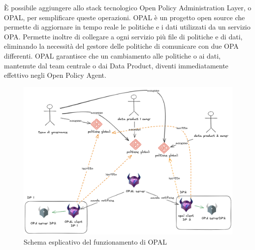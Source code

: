 \documentclass[12pt]{report}
\begin{document}
È possibile aggiungere allo stack tecnologico Open Policy Administration Layer, o OPAL, per semplificare queste operazioni.
OPAL è un progetto open source che permette di aggiornare in tempo reale le politiche e i dati utilizzati da un servizio OPA.
Permette inoltre di collegare a ogni servizio più file di politiche e di dati, eliminando la necessità del gestore delle politiche di comunicare con due OPA differenti.
OPAL garantisce che un cambiamento alle politiche o ai dati, mantenute dal team centrale o dai Data Product, diventi immediatamente effettivo negli Open Policy Agent.
\begin{figure}[H]
    \centering
    \includegraphics[width=\linewidth]{immagini/OPAL funzionamento.png}
    \caption{Schema esplicativo del funzionamento di OPAL}
    \label{funzionamento_OPAL}
\end{figure}
\end{document}
